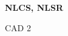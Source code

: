 \documentclass[a4paper]{article}
\begin{document}
\printGenericVSLHeader
\begin{center}
\begin{vsltext}{3cm}{4cm}

   \vspace{0.5cm} 

    \textbf{NLCS, NLSR} 

    \vspace{1.5cm}

    CAD 2

\end{vsltext}

\end{center}
\end{document}
